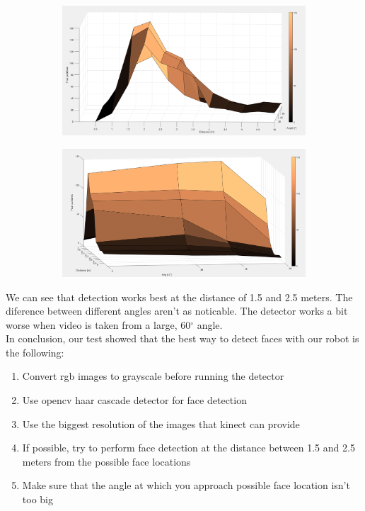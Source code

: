 \documentclass[12pt,a4paper]{article}
\begin{document}
	\begin{figure}[H]
		\begin{subfigure}{.5\linewidth}
			\centering
			\includegraphics[width=.8\linewidth]{graf5}
		\end{subfigure}
		\begin{subfigure}{.5\linewidth}
			\centering
			\includegraphics[width=.8\linewidth]{graf6}
		\end{subfigure}
	\end{figure}

	We can see that detection works best at the distance of 1.5 and 2.5 meters. The diference between different angles aren't as noticable. The detector works a bit worse when video is taken from a large, 60$^{\circ}$ angle. \\
	
	In conclusion, our test showed that the best way to detect faces with our robot is the following:
	\begin{enumerate}
		\item Convert rgb images to grayscale before running the detector
		\item Use opencv haar cascade detector for face detection
		\item Use the biggest resolution of the images that kinect can provide
		\item If possible, try to perform face detection at the distance between 1.5 and 2.5 meters from the possible face locations
		\item Make sure that the angle at which you approach possible face location isn't too big
	\end{enumerate}	
	
\end{document}
